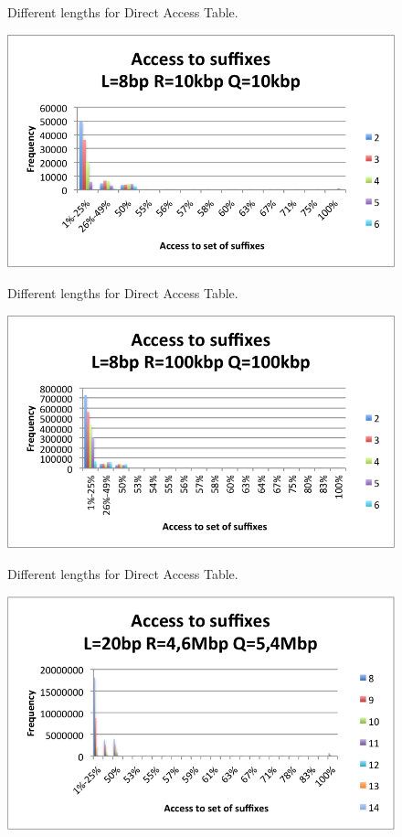 \documentclass[runningheads,a4paper]{llncs}
\begin{document}
{\begin{figure}
\label{fig:1k}
\caption{Different lengths for Direct Access Table.}
\end{figure} 
\begin{figure}
\centering
\includegraphics[scale=0.5]{10k.png}
\label{fig:10k}
\caption{Different lengths for Direct Access Table.}
\end{figure}
\begin{figure}
\centering
\includegraphics[scale=0.5]{100k.png}
\label{fig:100k}
\caption{Different lengths for Direct Access Table.}
\end{figure}
\begin{figure}
\centering
\includegraphics[scale=0.5]{Ecoli.png}

\end{figure}}
\end{document}
